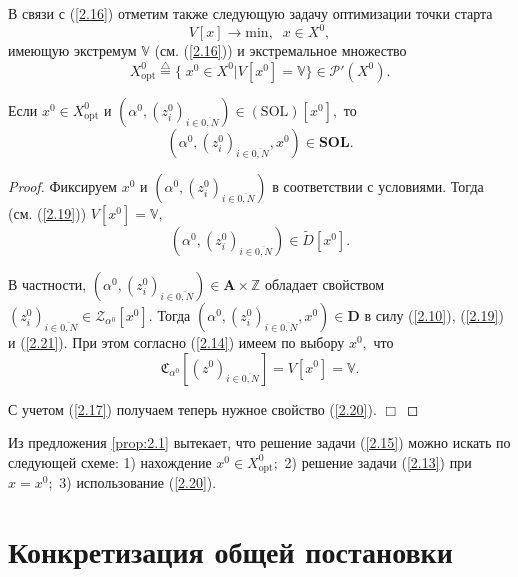 \documentclass[10pt]{SPIIRAS_Proceedings}
\begin{document}
В связи с (\ref{2.16})
отметим также следующую задачу оптимизации точки старта
\begin{equation}\label{2.18}
  V[x] \longrightarrow \mathrm{min},\;\;x \in X^0,
\end{equation}
имеющую экстремум $\mathbb{V}$
(см. (\ref{2.16})) и экстремальное множество
\begin{equation}\label{2.19}
  X^0_{\mathrm{opt}} \stackrel{\triangle}{=} \{\;x^0 \in X^0 \vert V[x^0] = \mathbb{V}\} \in \mathcal{P}'(X^0).
\end{equation}

\begin{proposition}
\label{prop:2.1}
Если
$x^0 \in X^0_{\mathrm{opt}}$ и $(\alpha^0,(z_i^0)_{i \in \overline{0,N}}) \in (\mathrm{SOL})[x^0],$
то
\begin{equation}\label{2.20}
  (\alpha^0,(z_i^0)_{i \in \overline{0,N}},x^0) \in \mathbf{SOL}.
\end{equation}
\end{proposition}

\begin{proof}

Фиксируем $x^0$ и $(\alpha^0,(z_i^0)_{i \in \overline{0,N}})$
в соответствии с условиями.
Тогда (см. (\ref{2.19}))
$V[x^0] = \mathbb{V},$
\begin{equation}\label{2.21}
 (\alpha^0,(z_i^0)_{i \in \overline{0,N}}) \in \tilde{D}[x^0].
\end{equation}

В частности,
$(\alpha^0,(z_i^0)_{i \in \overline{0,N}}) \in \mathbf{A} \times \mathbb{Z}$
обладает свойством
$(z_i^0)_{i \in \overline{0,N}} \in \mathcal{Z}_{\alpha^0}[x^0].$
Тогда
$(\alpha^0,(z_i^0)_{i \in \overline{0,N}},x^0) \in \mathbf{D}$
в силу (\ref{2.10}), (\ref{2.19}) и (\ref{2.21}).
При этом согласно (\ref{2.14})
имеем по выбору $x^0,$ что
$$
  \mathfrak{C}_{\alpha^0}[(z^0)_{i \in \overline{0,N}}] = V[x^0] = \mathbb{V}.
$$

С учетом (\ref{2.17}) получаем теперь нужное свойство (\ref{2.20}).
\hfill $\Box$
\end{proof}

Из предложения \ref{prop:2.1} вытекает,
что решение задачи (\ref{2.15})
можно искать по следующей схеме:
1) нахождение $x^0 \in X^0_{\mathrm{opt}};$
2) решение задачи (\ref{2.13}) при $x = x^0;$
3) использование (\ref{2.20}).

\section{Конкретизация общей постановки}
\label{sec:3}
\end{document}

